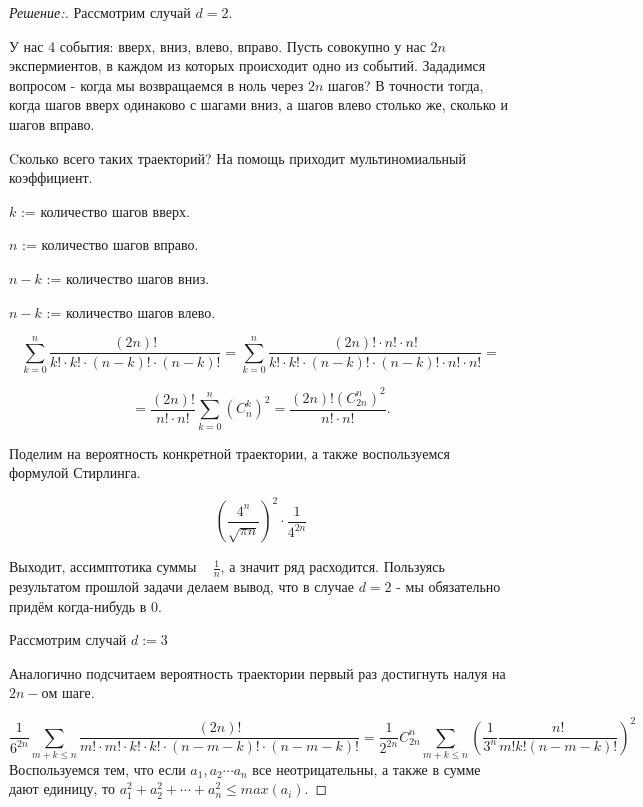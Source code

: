 \documentclass{article}
\begin{document}
\begin{proof}[Решение:]
Рассмотрим случай $d = 2$.

У нас 4 события: вверх, вниз, влево, вправо. Пусть совокупно у нас $2n$ экспермиентов, в каждом из которых происходит одно из событий. Зададимся вопросом - когда мы возвращаемся в ноль через $2n$ шагов? В точности тогда, когда шагов вверх одинаково с шагами вниз, а шагов влево столько же, сколько и шагов вправо.

Cколько всего таких траекторий? На помощь приходит мультиномиальный коэффициент.

$k$ := количество шагов вверх.

$n$ := количество шагов вправо.

$n-k$ := количество шагов вниз.

$n-k$ := количество шагов влево.

\[
    \sum_{k=0}^{n} \frac{(2n)!}{k! \cdot k! \cdot (n-k)! \cdot (n-k)!} = \sum_{k=0}^{n} \frac{(2n)! \cdot n! \cdot n!}{k! \cdot k! \cdot (n-k)! \cdot (n-k)!\cdot n! \cdot n!}  =
\]

\[
    = \frac{(2n)!}{n! \cdot n!} \sum_{k=0}^{n} (C_n^k)^2 = \frac{(2n)! (C_{2n}^n)^2}{n! \cdot n!}.
\]

Поделим на вероятность конкретной траектории, а также воспользуемся формулой Стирлинга.

\[
    \left(\frac{4^n}{\sqrt{\pi n}}\right)^2 \cdot \frac{1}{4^{2n}}
\]

        Выходит, ассимптотика суммы ~ $\frac{1}{n}$, а значит ряд расходится. Пользуясь результатом прошлой задачи делаем вывод, что в случае $d = 2$ - мы обязательно придём когда-нибудь в 0. 
        
        
        \vspace{\baselineskip}
        
        Рассмотрим случай $d := 3$
        
        Аналогично подсчитаем вероятность траектории первый раз достигнуть налуя на $2n-ом$ шаге.
        
        \[
\frac{1}{6^{2n}} \sum_{m + k \leq n}^{} \frac{(2n)!}{m! \cdot m! \cdot k! \cdot k! \cdot (n-m-k)! \cdot (n-m-k)!} = \frac{1}{2^{2n}} C_{2n}^n \sum_{m + k \leq n}^{} \left( \frac{1}{3^n} \frac{n!}{m!k!(n-m-k)!}   \right)^2
        
        \]
Воспользуемся тем, что если $a_1, a_2 \cdots a_n$ все неотрицательны, а также в сумме дают единицу, то $a_1^2 + a_2^2 + \cdots + a_n^2 \leq max(a_i)$.


\end{proof}
\end{document}
